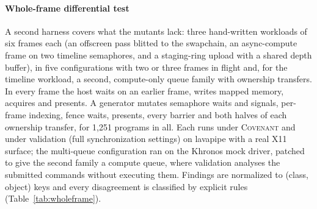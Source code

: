 \documentclass[acmtog,anonymous,review]{acmart}
\newcommand{\sys}{\textsc{Covenant}\xspace}
\begin{document}
\paragraph{Whole-frame differential test}
\label{sec:eval-wholeframe}
A second harness covers what the mutants lack: three hand-written workloads of six frames each (an offscreen pass
blitted to the swapchain, an async-compute frame on two timeline semaphores, and a staging-ring upload with a shared
depth buffer), in five configurations with two or three frames in flight and, for the timeline workload, a second,
compute-only queue family with ownership transfers. In every frame the host waits on an earlier frame, writes mapped
memory, acquires and presents. A generator mutates semaphore waits and signals, per-frame indexing, fence waits,
presents, every barrier and both halves of each ownership transfer, for 1,251 programs in all. Each runs under \sys
and under validation (full synchronization settings) on lavapipe with a real X11 surface; the
multi-queue configuration ran on the Khronos mock driver, patched to give the second family a compute queue, where
validation analyses the submitted commands without executing them. Findings are normalized to (class, object) keys and
every disagreement is classified by explicit rules (Table~\ref{tab:wholeframe}).
\end{document}

